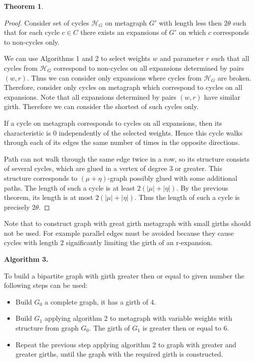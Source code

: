 \documentclass[leqno]{aadmbook}
\newtheorem{theorem}{Theorem}
\begin{document}
\begin{section}
\begin{theorem}
\end{theorem}

\begin{proof}

Consider set of cycles $\mathcal{H}_G$ on metagraph $G'$ with length less then $2 \theta$ such that for each cycle $c \in C$ there exists an expansions of $G'$ on which $c$ corresponds to non-cycles only. 

We can use Algorithms 1 and 2 to select weights $w$ and parameter $r$ such that all cycles from $\mathcal{H}_G$ correspond to non-cycles on all expansions determined by pairs $(w, r)$. Thus we can consider only expansions where cycles from $\mathcal{H}_G$ are broken. Therefore, consider only cycles on metagraph which correspond to cycles on all expansions. Note that all expansions determined by pairs $(w, r)$ have similar girth. Therefore we can consider the shortest of such cycles only.

If a cycle on metagraph corresponds to cycles on all expansions, then its characteristic is $0$ independently of the selected weights. Hence this cycle walks through each of its edges the same number of times in the opposite directions.

Path can not walk through the same edge twice in a row, so its structure consists of several cycles, which are glued in a vertex of degree $3$ or greater. This structure corresponds to $(\mu + \eta)$-graph possibly glued with some additional paths. The length of such a cycle is at least $2(|\mu| + |\eta|)$. By the previous theorem, its length is at most $2(|\mu| + |\eta|)$. Thus the length of such a cycle is precisely $2 \theta$.

\end{proof}

Note that to construct graph with great girth metagraph with small girths should not be used. For example parallel edges must be avoided because they cause cycles with length $2$ significantly limiting the girth of an r-expansion.

\textbf{Algorithm 3.}

To build a bipartite graph with girth greater then or equal to given number the following steps can be used: 

\begin{itemize}
    \item Build $G_0$ a complete graph, it has a girth of $4$.
    \item Build $G_1$ applying algorithm 2 to metagraph with variable weights with structure from graph $G_0$. The girth of $G_1$ is greater then or equal to $6$.
    \item Repeat the previous step applying algorithm 2 to graph with greater and greater girths, until the graph with the required girth is constructed.  
\end{itemize}


\end{section}
\end{document}
